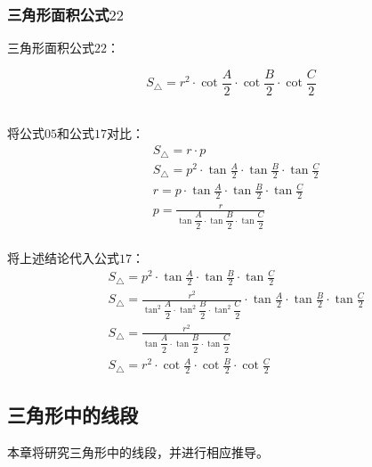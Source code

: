 \documentclass[UTF8]{ctexart}
\begin{document}
\subsubsection{三角形面积公式$22$}
    三角形面积公式$22$：
    \begin{large}
        \begin{equation*}
            S_{\triangle}=r^2\cdot\cot{\frac{A}{2}}\cdot\cot{\frac{B}{2}}\cdot\cot{\frac{C}{2}}
        \end{equation*}
    \end{large}\\
    将公式$05$和公式$17$对比：
    \setcounter{equation}{0}
    \begin{align}
        &S_{\triangle}=r\cdot p\\[3mm]
        &S_{\triangle}=p^2\cdot\tan{\frac{A}{2}}\cdot\tan{\frac{B}{2}}\cdot\tan{\frac{C}{2}}\\[3mm]
        &r=p\cdot\tan{\frac{A}{2}}\cdot\tan{\frac{B}{2}}\cdot\tan{\frac{C}{2}}\\[3mm]
        &p=\frac{r}{\tan{\dfrac{A}{2}}\cdot\tan{\dfrac{B}{2}}\cdot\tan{\dfrac{C}{2}}}
    \end{align}\\
    将上述结论代入公式$17$：\vspace{5pt}
    \begin{align}
        &S_{\triangle}=p^2\cdot\tan{\frac{A}{2}}\cdot\tan{\frac{B}{2}}\cdot\tan{\frac{C}{2}}\\[3mm]
        &S_{\triangle}=\frac{r^2}{\tan^2{\dfrac{A}{2}}\cdot\tan^2{\dfrac{B}{2}}\cdot\tan^2{\dfrac{C}{2}}}\cdot\tan{\frac{A}{2}}\cdot\tan{\frac{B}{2}}\cdot\tan{\frac{C}{2}}\\[3mm]
        &S_{\triangle}=\frac{r^2}{\tan{\dfrac{A}{2}}\cdot\tan{\dfrac{B}{2}}\cdot\tan{\dfrac{C}{2}}}\\[3mm]
        &S_{\triangle}=r^2\cdot\cot{\frac{A}{2}}\cdot\cot{\frac{B}{2}}\cdot\cot{\frac{C}{2}}
    \end{align}

\newpage

\subsection{三角形中的线段}
    本章将研究三角形中的线段，并进行相应推导。
\end{document}

